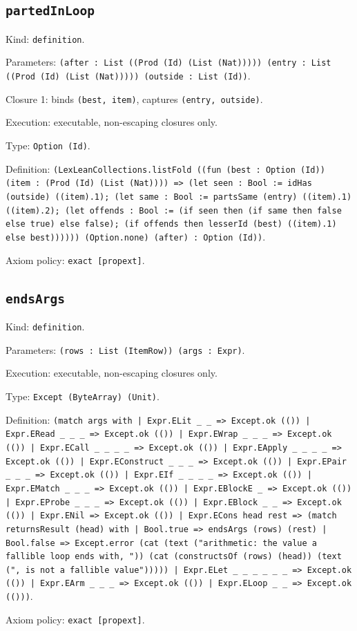 \documentclass[11pt]{article}
\begin{document}
\subsection*{\texttt{partedInLoop}}
\noindent Kind: \texttt{definition}.\par
\noindent Parameters: \texttt{(after : List ((Prod (Id) (List (Nat))))) (entry : List ((Prod (Id) (List (Nat))))) (outside : List (Id))}.\par
\noindent Closure 1: binds \texttt{(best, item)}, captures \texttt{(entry, outside)}.\par
\noindent Execution: executable, non-escaping closures only.\par
\noindent Type: \texttt{Option (Id)}.\par
\noindent Definition: \texttt{(LexLeanCollections.listFold ((fun (best : Option (Id)) (item : (Prod (Id) (List (Nat)))) => (let seen : Bool := idHas (outside) ((item).1); (let same : Bool := partsSame (entry) ((item).1) ((item).2); (let offends : Bool := (if seen then (if same then false else true) else false); (if offends then lesserId (best) ((item).1) else best)))))) (Option.none) (after) : Option (Id))}.\par
\noindent Axiom policy: \texttt{exact [propext]}.\par
\subsection*{\texttt{endsArgs}}
\noindent Kind: \texttt{definition}.\par
\noindent Parameters: \texttt{(rows : List (ItemRow)) (args : Expr)}.\par
\noindent Execution: executable, non-escaping closures only.\par
\noindent Type: \texttt{Except (ByteArray) (Unit)}.\par
\noindent Definition: \texttt{(match args with | Expr.ELit \_ \_ => Except.ok (()) | Expr.ERead \_ \_ \_ => Except.ok (()) | Expr.EWrap \_ \_ \_ => Except.ok (()) | Expr.ECall \_ \_ \_ \_ => Except.ok (()) | Expr.EApply \_ \_ \_ \_ => Except.ok (()) | Expr.EConstruct \_ \_ \_ => Except.ok (()) | Expr.EPair \_ \_ \_ => Except.ok (()) | Expr.EIf \_ \_ \_ \_ => Except.ok (()) | Expr.EMatch \_ \_ \_ => Except.ok (()) | Expr.EBlockE \_ => Except.ok (()) | Expr.EProbe \_ \_ \_ => Except.ok (()) | Expr.EBlock \_ \_ => Except.ok (()) | Expr.ENil => Except.ok (()) | Expr.ECons head rest => (match returnsResult (head) with | Bool.true => endsArgs (rows) (rest) | Bool.false => Except.error (cat (text ("arithmetic: the value a fallible loop ends with, ")) (cat (constructsOf (rows) (head)) (text (", is not a fallible value"))))) | Expr.ELet \_ \_ \_ \_ \_ \_ => Except.ok (()) | Expr.EArm \_ \_ \_ => Except.ok (()) | Expr.ELoop \_ \_ => Except.ok (()))}.\par
\noindent Axiom policy: \texttt{exact [propext]}.\par
\end{document}
